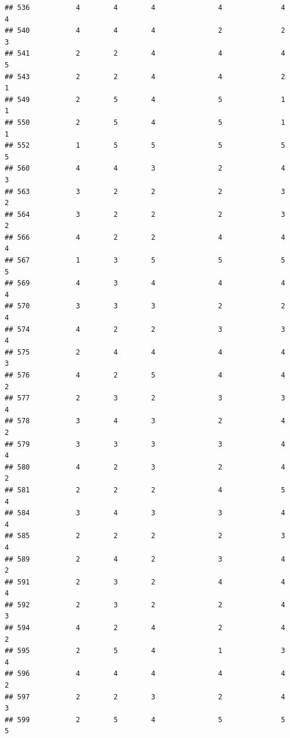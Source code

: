 \documentclass[
]{article}
\begin{document}
\begin{verbatim}
## 536           4        4        4               4              4             4
## 540           4        4        4               2              2             3
## 541           2        2        4               4              4             5
## 543           2        2        4               4              2             1
## 549           2        5        4               5              1             1
## 550           2        5        4               5              1             1
## 552           1        5        5               5              5             5
## 560           4        4        3               2              4             3
## 563           3        2        2               2              3             2
## 564           3        2        2               2              3             2
## 566           4        2        2               4              4             4
## 567           1        3        5               5              5             5
## 569           4        3        4               4              4             4
## 570           3        3        3               2              2             4
## 574           4        2        2               3              3             4
## 575           2        4        4               4              4             3
## 576           4        2        5               4              4             2
## 577           2        3        2               3              3             4
## 578           3        4        3               2              4             2
## 579           3        3        3               3              4             4
## 580           4        2        3               2              4             2
## 581           2        2        2               4              5             4
## 584           3        4        3               3              4             4
## 585           2        2        2               2              3             4
## 589           2        4        2               3              4             2
## 591           2        3        2               4              4             4
## 592           2        3        2               2              4             3
## 594           4        2        4               2              4             2
## 595           2        5        4               1              3             4
## 596           4        4        4               4              4             2
## 597           2        2        3               2              4             3
## 599           2        5        4               5              5             5

\end{verbatim}
\end{document}
